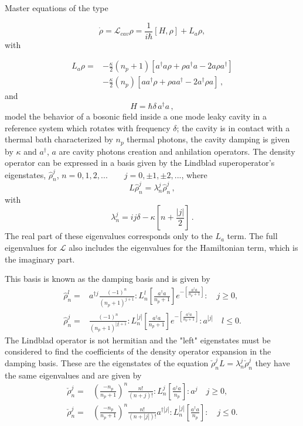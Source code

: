 \documentclass[reprint, amsmath,amssymb, aps,pra]{revtex4-1}
\begin{document}
Master equations of the type 

\begin{equation}
\dot{\rho} = \mathcal{L}_{cav} \rho = \frac{1}{i\hbar}[H,\rho]+L_a\rho, 
\end{equation} with

\begin{align}\label{EMField}
L_a \rho =& - \frac{\kappa}{2}(n_p+1)[a^\dagger a\rho + \rho a^\dagger a -2a\rho a^\dagger] \nonumber \\
 &- \frac{\kappa}{2}(n_p)[ aa^\dagger\rho + \rho  aa^\dagger -2a^\dagger\rho a]\, ,
\end{align}
and
\begin{equation}
  H=\hbar \delta \, a^\dagger a\, ,
\end{equation}
model the behavior of a bosonic field inside a one mode leaky cavity
in a reference system which rotates with frequency $\delta$; the cavity is in contact with a thermal bath
characterized by $n_p$ thermal photons, the
cavity damping is given by $\kappa$ \cite{EnglertDB} and $a^\dagger$,
$a$ are cavity photons creation and anhilation operators. The density
operator can be expressed in a basis given by the Lindblad
superoperator's eigenstates, ${\hat{\rho}_n^j}$,
$n=0,1,2,...\qquad j = 0,\pm 1, \pm 2,... $, where
\begin{equation}
L\hat{\rho}_n^j = \lambda_n^j\hat{\rho}_n^j\label{eq:eigen_damping}\, ,
\end{equation}
with
\begin{equation}
\lambda_n^j = ij\delta -\kappa[n + \frac{|j|}{2}]\, .
\end{equation} The real part of these eigenvalues corresponds only to the $L_a$ term. The full eigenvalues for $\mathcal{L}$  also includes the eigenvalues for the Hamiltonian term, which is the imaginary part.



This basis is known as the damping basis \cite{EnglertDB} and is given by
\begin{align}\label{DefDB}
\hat{\rho}_n^l=&a^{\dagger j}\frac{(-1)^n}{(n_p+1)^{j+1}}:L_n^l[\frac{a^\dagger a}{n_p+1}]e^{-[\frac{a^\dagger a}{n_p+1}]}:\quad j \geq 0, \\
\hat{\rho}_n^j=&\frac{(-1)^n}{(n_p+1)^{|j|+1}}:L_n^{|j|}[\frac{a^\dagger a}{n_p+1}]e^{-[\frac{a^\dagger a}{n_p+1}]}:a^{|j|}\quad l \leq 0.
\end{align}
The Lindblad operator is not hermitian and the "left" eigenstates must
be considered to find the coefficients of the density operator
expansion in the damping basis. These are the eigenstates of the
equation $\check{\rho}_n^jL = \lambda_n^j\check{\rho}_n^j$ they have
the same eigenvalues and are given by
\begin{align}\label{DefDBDual}
\check{\rho}_n^j=&(\frac{-n_p}{n_p+1})^n\frac{n!}{(n+j)!}:L_n^j[\frac{a^\dagger a}{n_p}]:a^{j}\quad j \geq 0, \\
\check{\rho}_n^j=&(\frac{-n_p}{n_p+1})^n\frac{n!}{(n+|j|)!}a^{\dagger|j|}:L_n^{|j|}[\frac{a^\dagger a}{n_p}]:\quad j \leq 0.
\end{align}
\end{document}
